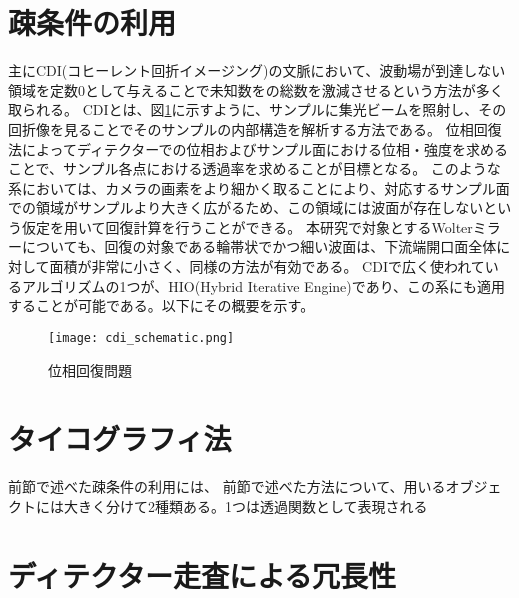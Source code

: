\clearpage
\newpage

\section{疎条件の利用}
主にCDI(コヒーレント回折イメージング)の文脈において、波動場が到達しない領域を定数0として与えることで未知数をの総数を激減させるという方法が多く取られる。
CDIとは、図\ref{fig:cdi_schematic}に示すように、サンプルに集光ビームを照射し、その回折像を見ることでそのサンプルの内部構造を解析する方法である。
位相回復法によってディテクターでの位相およびサンプル面における位相・強度を求めることで、サンプル各点における透過率を求めることが目標となる。
このような系においては、カメラの画素をより細かく取ることにより、対応するサンプル面での領域がサンプルより大きく広がるため、この領域には波面が存在しないという仮定を用いて回復計算を行うことができる。
本研究で対象とするWolterミラーについても、回復の対象である輪帯状でかつ細い波面は、下流端開口面全体に対して面積が非常に小さく、同様の方法が有効である。
CDIで広く使われているアルゴリズムの1つが、HIO(Hybrid Iterative Engine)であり、この系にも適用することが可能である。以下にその概要を示す。

\begin{figure}[!ht]
\centering
\texttt{[image: cdi\_schematic.png]}
\caption{位相回復問題}
\label{fig:cdi_schematic}
\end{figure}


\clearpage
\newpage

\section{タイコグラフィ法}
前節で述べた疎条件の利用には、
前節で述べた方法について、用いるオブジェクトには大きく分けて2種類ある。1つは透過関数として表現される

\clearpage
\newpage



\section{ディテクター走査による冗長性}


\clearpage
\newpage

